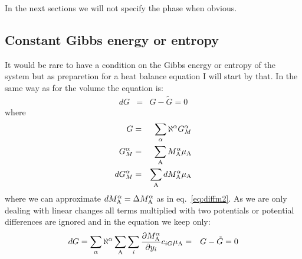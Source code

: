 \documentclass[12pt]{article}
\begin{document}
In the next sections we will not specify the phase when obvious.

\subsection{Constant Gibbs energy or entropy}

It would be rare to have a condition on the Gibbs energy or entropy of
the system but as preparetion for a heat balance equation I will start
by that.  In the same way as for the volume the equation is:
\begin{eqnarray}
dG &=& G-\tilde G = 0
\end{eqnarray}
where
\begin{eqnarray}
G &=& \sum_{\alpha} \aleph^{\alpha} G_M^{\alpha}\\
G^{\alpha}_M &=& \sum_{\rm A} M^{\alpha}_{\rm A} \mu_{\rm A}\\
dG^{\alpha}_M &=& \sum_{\rm A} dM^{\alpha}_{\rm A} \mu_{\rm A}
\end{eqnarray}
where we can approximate $dM^{\alpha}_{\rm A} = \Delta M^{\alpha}_{\rm
  A}$ as in eq.~\ref{eq:diffm2}.  As we are only dealing with linear
changes all terms multiplied with two potentials or potential
differences are ignored and in the equation we keep only:
\begin{eqnarray}
dG = \sum_{\alpha} \aleph^{\alpha}\sum_{\rm A} \sum_i \frac{\partial M^{\alpha}_{\rm A}}{\partial y_i}c_{iG}\mu_{\rm A} &=& G - \tilde G = 0\label{eq:gcond1}
\end{eqnarray}
\end{document}
